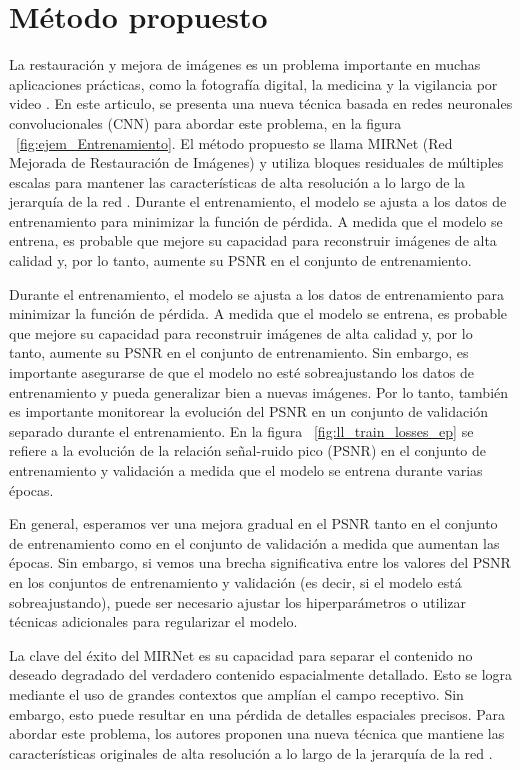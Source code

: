 \documentclass[a4paper,
               ]{jacow}
\begin{document}
\section{Método propuesto}
La restauración y mejora de imágenes es un problema importante en muchas aplicaciones prácticas, como la fotografía digital, la medicina y la vigilancia por video \cite{zhang2017beyond}. En este articulo, se presenta una nueva técnica basada en redes neuronales convolucionales (CNN) para abordar este problema, en la figura ~\ref{fig:ejem_Entrenamiento}. El método propuesto se llama MIRNet (Red Mejorada de Restauración de Imágenes) y utiliza bloques residuales de múltiples escalas para mantener las características de alta resolución a lo largo de la jerarquía de la red \cite{tian2020learning}. Durante el entrenamiento, el modelo se ajusta a los datos de entrenamiento para minimizar la función de pérdida. A medida que el modelo se entrena, es probable que mejore su capacidad para reconstruir imágenes de alta calidad y, por lo tanto, aumente su PSNR en el conjunto de entrenamiento.

Durante el entrenamiento, el modelo se ajusta a los datos de entrenamiento para minimizar la función de pérdida. A medida que el modelo se entrena, es probable que mejore su capacidad para reconstruir imágenes de alta calidad y, por lo tanto, aumente su PSNR en el conjunto de entrenamiento. Sin embargo, es importante asegurarse de que el modelo no esté sobreajustando los datos de entrenamiento y pueda generalizar bien a nuevas imágenes. Por lo tanto, también es importante monitorear la evolución del PSNR en un conjunto de validación separado durante el entrenamiento. En la figura  ~\ref{fig:ll_train_losses_ep} se refiere a la evolución de la relación señal-ruido pico (PSNR) en el conjunto de entrenamiento y validación a medida que el modelo se entrena durante varias épocas.

En general, esperamos ver una mejora gradual en el PSNR tanto en el conjunto de entrenamiento como en el conjunto de validación a medida que aumentan las épocas. Sin embargo, si vemos una brecha significativa entre los valores del PSNR en los conjuntos de entrenamiento y validación (es decir, si el modelo está sobreajustando), puede ser necesario ajustar los hiperparámetros o utilizar técnicas adicionales para regularizar el modelo.

La clave del éxito del MIRNet es su capacidad para separar el contenido no deseado degradado del verdadero contenido espacialmente detallado. Esto se logra mediante el uso de grandes contextos que amplían el campo receptivo. Sin embargo, esto puede resultar en una pérdida de detalles espaciales precisos. Para abordar este problema, los autores proponen una nueva técnica que mantiene las características originales de alta resolución a lo largo de la jerarquía de la red \cite{tian2020learning}.
\end{document}
